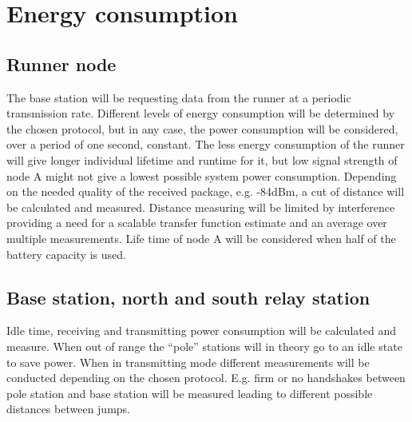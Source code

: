 \section{Energy consumption}\label{sc:powerConsumption}
\subsection{Runner node}
The base station will be requesting data from the runner at a periodic transmission rate. Different levels of energy consumption will be determined by the chosen protocol, but in any case, the power consumption will be considered, over a period of one second, constant. The less energy consumption of the runner will give longer individual lifetime and runtime for it, but low signal strength of node A might not give a lowest possible system power consumption. Depending on the needed quality of the received package, e.g. -84dBm, a cut of distance will be calculated and measured. Distance measuring will be limited by interference providing a need for a scalable transfer function estimate and an average over multiple measurements. Life time of node A will be considered when half of the battery capacity is used.

\subsection{Base station, north and south relay station}

Idle time, receiving and transmitting power consumption will be calculated and measure. When out of range the “pole” stations will in theory go to an idle state to save power. When in transmitting mode different measurements will be conducted depending on the chosen protocol. E.g. firm or no handshakes between pole station and base station will be measured leading to different possible distances between jumps.